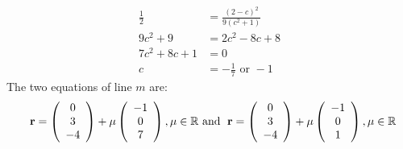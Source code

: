 \documentclass[12pt, a4 paper]{article}
\begin{document}
\begin{outline}[enumerate]
\begin{align*}
					\end{align*}
					\begin{align*}
						\frac{1}{2} & = \frac{{{{(2 - c)}^2}}}{{9({c^2} + 1)}} \\9{c^2} + 9 &= 2{c^2} - 8c + 8\\7{c^2} + 8c + 1 &= 0\\c &=  - \frac{1}{7}{\textrm{ or }} - 1
					\end{align*}
					\textrm{The two equations of line }$m${ are: }
					\begin{align*}
						{\textrm{ }}\;{\bf{r}} = \left( {\begin{array}{*{20}{c}}0 \\3\\{ - 4}\end{array}} \right) + \mu \left( {\begin{array}{*{20}{c}}{ - 1}\\0\\7\end{array}} \right),\mu  \in \mathbb{R}{\textrm{ and  }}\;{\bf{r}} = \left( {\begin{array}{*{20}{c}}0\\3\\{ - 4}\end{array}} \right) + \mu \left( {\begin{array}{*{20}{c}}{ - 1}\\0\\1\end{array}} \right),\mu  \in \mathbb{R}
					\end{align*}

					\color{black}


\end{outline}
\end{document}
